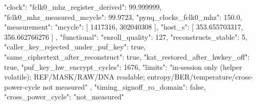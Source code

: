 \begin{codeblock}
{
  "clock": {
    "fclk0_mhz_register_derived": 99.999999,
    "fclk0_mhz_measured_mcycle": 99.9723,
    "pynq_clocks_fclk0_mhz": 150.0,
    "measurement": {
      "mcycle": [
        1417316,
        302040308
      ],
      "host_s": [
        353.655703317,
        356.662766276
      ]
    }
  },
  "functional": {
    "enroll_quality": 127,
    "reconstructs_stable": 5,
    "caller_key_rejected_under_puf_key": true,
    "same_ciphertext_after_reconstruct": true,
    "kat_restored_after_hwkey_off": true,
    "puf_key_hw_encrypt_cycles": 1676,
    "limits": "in-session only (helper volatile); REF/MASK/RAW/DNA readable; entropy/BER/temperature/cross-power-cycle not measured"
  },
  "timing_signoff_ro_domain": false,
  "cross_power_cycle": "not_measured"
}
\end{codeblock}

